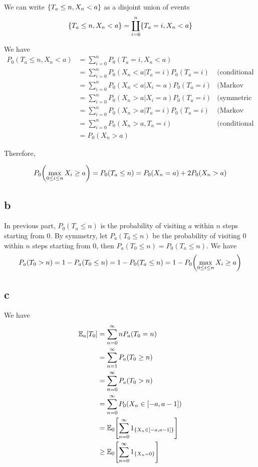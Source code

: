 \documentclass{article}
\begin{document}
We can write $\set*{T_a \leq n, X_n < a}$ as a disjoint union of events
$$
    \set*{T_a \leq n, X_n < a} = \coprod_{i=0}^n \set*{T_a = i, X_n < a}
$$

We have
\begin{align*}
    P_0(T_a \leq n, X_n < a)
    &= \sum_{i=0}^n P_0(T_a = i, X_n < a) \\
    &= \sum_{i=0}^n P_0(X_n < a | T_a = i) P_0(T_a = i) &\text{(conditional probability)}\\
    &= \sum_{i=0}^n P_0(X_n < a | X_i = a) P_0(T_a = i) &\text{(Markov property)}\\
    &= \sum_{i=0}^n P_0(X_n > a | X_i = a) P_0(T_a = i) &\text{(symmetric random walk)}\\
    &= \sum_{i=0}^n P_0(X_n > a | T_a = i) P_0(T_a = i) &\text{(Markov property)}\\
    &= \sum_{i=0}^n P_0(X_n > a, T_a = i) &\text{(conditional probability)}\\
    &= P_0(X_n > a)
\end{align*}

Therefore,

$$
    P_0\tuple*{\max_{0 \leq i \leq n} X_i \geq a} = P_0(T_a \leq n) = P_0(X_n = a) + 2 P_0(X_n > a)
$$

\subsection{b}

In previous part, $P_0(T_a \leq n)$ is the probability of visiting $a$ within $n$ steps starting from $0$. By symmetry, let $P_a(T_0 \leq n)$ be the probability of visiting $0$ within $n$ steps starting from $0$, then $P_a(T_0 \leq n) = P_0(T_a \leq n)$. We have
$$
    P_a(T_0 > n) = 1 - P_a(T_0 \leq n) = 1 - P_0(T_a \leq n) = 1 - P_0\tuple*{\max_{0 \leq i \leq n} X_i \geq a}
$$

\subsection{c}


We have 
\begin{align*}
    \Exp_a[T_0]
    &= \sum_{n=0}^\infty n P_a(T_0 = n) \\
    &= \sum_{n=1}^\infty P_a(T_0 \geq n) \\
    &= \sum_{n=0}^\infty P_a(T_0 > n) \\
    &= \sum_{n=0}^\infty P_0(X_n \in [-a, a-1]) \\
    &= \Exp_0\bracket*{\sum_{n=0}^\infty 1_{\set{X_n \in [-a, a-1]}}} \\
    &\geq \Exp_0\bracket*{\sum_{n=0}^\infty 1_{\set{X_n=0}}}
\end{align*}
\end{document}
